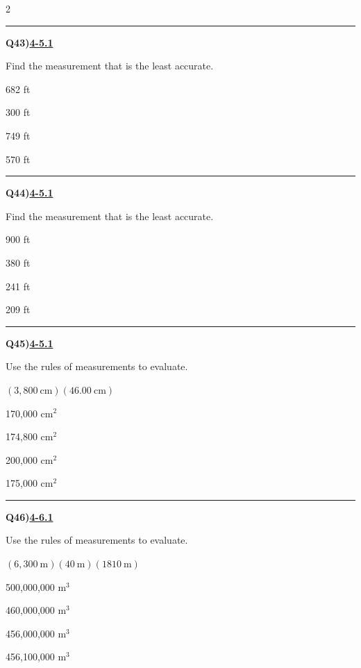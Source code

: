 \documentclass[11pt]{article}
\newenvironment{Qbox}[2]{%
  \par\medskip\noindent\begin{minipage}{\linewidth}%
  \hrule\medskip%
  \textbf{Q#1)}\hfill\textbf{\underline{#2}}\par\smallskip%
}{\par\end{minipage}\par\medskip}
\begin{document}
\begin{multicols}{2}
\begin{Qbox}{43}{4-5.1}
Find the measurement that is the least accurate.
\begin{choices}
  \item 682 ft
  \item 300 ft
  \item 749 ft
  \item 570 ft
\end{choices}
\end{Qbox}

\begin{Qbox}{44}{4-5.1}
Find the measurement that is the least accurate.
\begin{choices}
  \item 900 ft
  \item 380 ft
  \item 241 ft
  \item 209 ft
\end{choices}
\end{Qbox}

\begin{Qbox}{45}{4-5.1}
Use the rules of measurements to evaluate.\par\medskip $(3{,}800\ \text{cm})(46.00\ \text{cm})$
\begin{choices}
  \item 170,000 cm$^2$
  \item 174,800 cm$^2$
  \item 200,000 cm$^2$
  \item 175,000 cm$^2$
\end{choices}
\end{Qbox}

\begin{Qbox}{46}{4-6.1}
Use the rules of measurements to evaluate.\par\medskip $(6{,}300\ \text{m})(40\ \text{m})(1810\ \text{m})$
\begin{choices}
  \item 500,000,000 m$^3$
  \item 460,000,000 m$^3$
  \item 456,000,000 m$^3$
  \item 456,100,000 m$^3$
\end{choices}
\end{Qbox}


\end{multicols}
\end{document}
